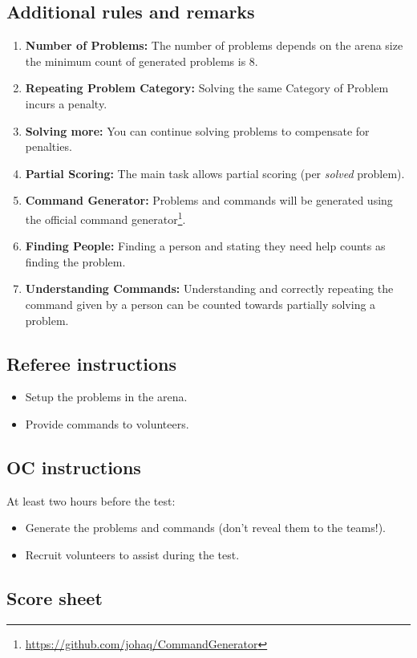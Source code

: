 \subsection*{Additional rules and remarks}
\begin{enumerate}[nosep]
	\item \textbf{Number of Problems:} The number of problems depends on the arena size the minimum count of generated problems is 8.
	\item \textbf{Repeating Problem Category:} Solving the same Category of Problem incurs a penalty. 
	\item \textbf{Solving more:} You can continue solving problems to compensate for penalties.
	\item \textbf{Partial Scoring:} The main task allows partial scoring (per \emph{solved} problem).
	\item \textbf{Command Generator:} Problems and commands will be generated using the official command generator\footnote{\url{https://github.com/johaq/CommandGenerator}}.
	\item \textbf{Finding People:} Finding a person and stating they need help counts as finding the problem.
	\item \textbf{Understanding Commands:} Understanding and correctly repeating the command given by a person can be counted towards partially solving a problem.
\end{enumerate}

\subsection*{Referee instructions}
\begin{itemize}
	\item Setup the problems in the arena.
	\item Provide commands to volunteers.
\end{itemize}

\subsection*{OC instructions}

At least two hours before the test:
\begin{itemize}
	\item Generate the problems and commands (don't reveal them to the teams!).
	\item Recruit volunteers to assist during the test.
\end{itemize}


\subsection*{Score sheet}


